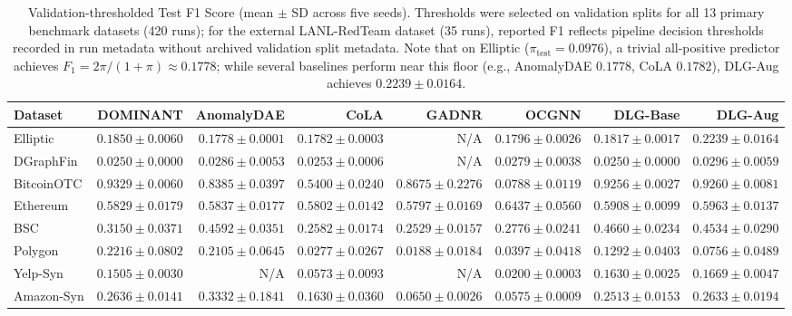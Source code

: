 \documentclass[11pt,a4paper]{article}
\begin{document}
\begin{table}[H]
\centering\fontsize{7.2pt}{8.5pt}\selectfont\setlength{\tabcolsep}{1.2pt}
\caption{Validation-thresholded Test F1 Score (mean $\pm$ SD across five seeds). Thresholds were selected on validation splits for all 13 primary benchmark datasets (420 runs); for the external LANL-RedTeam dataset (35 runs), reported F1 reflects pipeline decision thresholds recorded in run metadata without archived validation split metadata. Note that on Elliptic ($\pi_{\mathrm{test}} = 0.0976$), a trivial all-positive predictor achieves $F_1 = 2\pi / (1+\pi) \approx 0.1778$; while several baselines perform near this floor (e.g., AnomalyDAE $0.1778$, CoLA $0.1782$), DLG-Aug achieves $0.2239 \pm 0.0164$.}
\label{tab:app_f1_full}
\begin{tabular*}{\textwidth}{@{\extracolsep{\fill}}lrrrrrrr}\toprule
\textbf{Dataset} & \textbf{DOMINANT} & \textbf{AnomalyDAE} & \textbf{CoLA} & \textbf{GADNR} & \textbf{OCGNN} & \textbf{DLG-Base} & \textbf{DLG-Aug} \\\midrule
Elliptic & $0.1850 \pm 0.0060$ & $0.1778 \pm 0.0001$ & $0.1782 \pm 0.0003$ & N/A & $0.1796 \pm 0.0026$ & $0.1817 \pm 0.0017$ & $\mathbf{0.2239 \pm 0.0164}$ \\
DGraphFin & $0.0250 \pm 0.0000$ & $0.0286 \pm 0.0053$ & $0.0253 \pm 0.0006$ & N/A & $0.0279 \pm 0.0038$ & $0.0250 \pm 0.0000$ & $\mathbf{0.0296 \pm 0.0059}$ \\
BitcoinOTC & $\mathbf{0.9329 \pm 0.0060}$ & $0.8385 \pm 0.0397$ & $0.5400 \pm 0.0240$ & $0.8675 \pm 0.2276$ & $0.0788 \pm 0.0119$ & $0.9256 \pm 0.0027$ & $0.9260 \pm 0.0081$ \\
Ethereum & $0.5829 \pm 0.0179$ & $0.5837 \pm 0.0177$ & $0.5802 \pm 0.0142$ & $0.5797 \pm 0.0169$ & $\mathbf{0.6437 \pm 0.0560}$ & $0.5908 \pm 0.0099$ & $0.5963 \pm 0.0137$ \\
BSC & $0.3150 \pm 0.0371$ & $0.4592 \pm 0.0351$ & $0.2582 \pm 0.0174$ & $0.2529 \pm 0.0157$ & $0.2776 \pm 0.0241$ & $\mathbf{0.4660 \pm 0.0234}$ & $0.4534 \pm 0.0290$ \\
Polygon & $\mathbf{0.2216 \pm 0.0802}$ & $0.2105 \pm 0.0645$ & $0.0277 \pm 0.0267$ & $0.0188 \pm 0.0184$ & $0.0397 \pm 0.0418$ & $0.1292 \pm 0.0403$ & $0.0756 \pm 0.0489$ \\
Yelp-Syn & $0.1505 \pm 0.0030$ & N/A & $0.0573 \pm 0.0093$ & N/A & $0.0200 \pm 0.0003$ & $0.1630 \pm 0.0025$ & $\mathbf{0.1669 \pm 0.0047}$ \\
Amazon-Syn & $0.2636 \pm 0.0141$ & $\mathbf{0.3332 \pm 0.1841}$ & $0.1630 \pm 0.0360$ & $0.0650 \pm 0.0026$ & $0.0575 \pm 0.0009$ & $0.2513 \pm 0.0153$ & $0.2633 \pm 0.0194$ \\

\end{tabular*}
\end{table}
\end{document}
